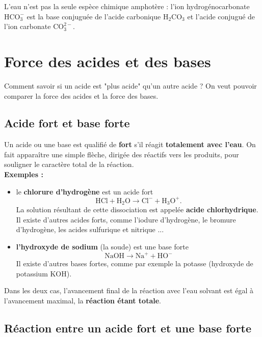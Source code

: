 \documentclass[11pt,a4paper]{report}
\begin{document}
L'eau n'est pas la seule espèce chimique amphotère : l'ion hydrogénocarbonate $\text{HCO}_3^-$ est la base conjuguée de l'acide carbonique $\text{H}_2\text{CO}_3$ et l'acide conjugué de l'ion carbonate $\text{CO}_3^{2-}$.

\newpage
\section{Force des acides et des bases}

Comment savoir si un acide est "plus acide" qu'un autre acide ? On veut pouvoir comparer la force des acides et la force des bases.

\subsection{Acide fort et base forte}

Un acide ou une base est qualifié de \textbf{fort} s'il réagit \textbf{totalement avec l'eau}. On fait apparaître une simple flèche, dirigée des réactifs vers les produits, pour souligner le caractère total de la réaction.\\

\textbf{Exemples :}
\begin{itemize}
	\item le \textbf{chlorure d'hydrogène} est un acide fort
	\begin{equation}
		\text{HCl} + \text{H}_2\text{O} \rightarrow \text{Cl}^- + \text{H}_3\text{O}^+.
	\end{equation}
	La solution résultant de cette dissociation est appelée \textbf{acide chlorhydrique}. Il existe 		d'autres acides forts, comme l'iodure d'hydrogène, le bromure d'hydrogène, les acides sulfurique 		et nitrique ...\\
	
	\item \textbf{l'hydroxyde de sodium} (la soude) est une base forte
	\begin{equation}
		\text{NaOH} \rightarrow \text{Na}^+ + \text{HO}^-
	\end{equation}
	Il existe d'autres bases fortes, comme par exemple la potasse (hydroxyde de potassium KOH).\\
\end{itemize}

Dans les deux cas, l'avancement final de la réaction avec l'eau solvant est égal à l'avancement maximal, la \textbf{réaction étant totale}.

\subsection{Réaction entre un acide fort et une base forte}
\end{document}
